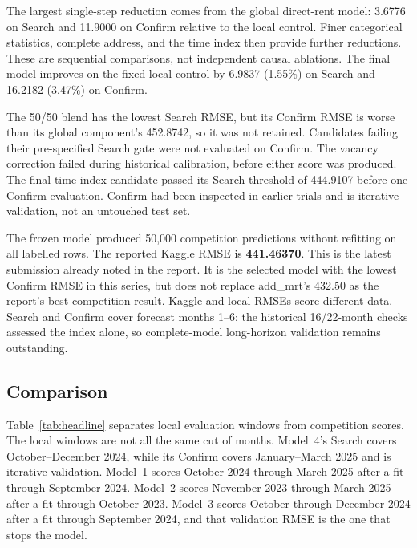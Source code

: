 \documentclass[11pt,a4paper]{article}
\begin{document}
The largest single-step reduction comes from the global
direct-rent model: 3.6776 on Search and 11.9000 on Confirm
relative to the local control.
Finer categorical statistics, complete address, and the time
index then provide further reductions.
These are sequential comparisons, not independent causal ablations.
The final model improves on the fixed local control by
6.9837 (1.55\%) on Search and 16.2182 (3.47\%) on Confirm.

The 50/50 blend has the lowest Search RMSE, but its Confirm
RMSE is worse than its global component's 452.8742,
so it was not retained.
Candidates failing their pre-specified Search gate were not
evaluated on Confirm.
The vacancy correction failed during historical calibration,
before either score was produced.
The final time-index candidate passed its Search threshold of
444.9107 before one Confirm evaluation.
Confirm had been inspected in earlier trials and is iterative
validation, not an untouched test set.

The frozen model produced 50{,}000 competition predictions
without refitting on all labelled rows.
The reported Kaggle RMSE is \textbf{441.46370}.
This is the latest submission already noted in the report.
It is the selected model with the lowest Confirm RMSE in this
series, but does not replace add\_mrt's 432.50 as the report's
best competition result.
Kaggle and local RMSEs score different data.
Search and Confirm cover forecast months 1--6; the historical
16/22-month checks assessed the index alone, so complete-model
long-horizon validation remains outstanding.

\FloatBarrier


\subsection{Comparison}
\label{sec:headline}

Table~\ref{tab:headline} separates local evaluation windows
from competition scores.
The local windows are not all the same cut of months.
Model~4's Search covers October--December 2024, while its
Confirm covers January--March 2025 and is iterative validation.
Model~1 scores October 2024 through March 2025 after a fit through September 2024.
Model~2 scores November 2023 through March 2025 after a fit through October 2023.
Model~3 scores October through December 2024 after a fit through September 2024, and that validation RMSE is the one that stops the model.
\end{document}
